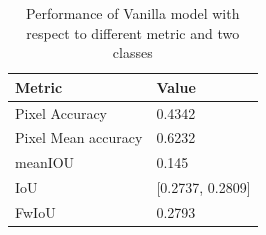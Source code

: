 	\begin{table}
	\begin{center}
		\begin{tabular}{ | l | p{12cm} |}
			\hline
			
			\cellcolor{purple!30}Metric & \cellcolor{purple!30}Value \\ \hline
			Pixel Accuracy & 0.4342 \\ \hline
			Pixel Mean accuracy & 0.6232  \\ \hline
			meanIOU & 0.145 \\ \hline
			IoU & [0.2737, 0.2809] \\ \hline
			FwIoU & 0.2793 \\ \hline
			\hline
		\end{tabular}
		\caption{Performance of Vanilla model with respect to different metric and two classes}
		\label{table:Vanilla_conti_seq}
	\end{center}
	\end{table}
	
